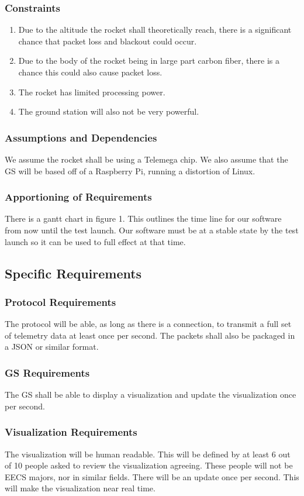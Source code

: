 \documentclass[onecolumn, draftclsnofoot,10pt, compsoc]{IEEEtran}
\begin{document}
\subsubsection{Constraints}
 \begin{enumerate}
    \item Due to the altitude the rocket shall theoretically reach, there is a significant chance that
packet loss and blackout could occur.
    \item Due to the body of the rocket being in large part carbon fiber, there is a chance this could
also cause packet loss.
    \item The rocket has limited processing power.
    \item The ground station will also not be very powerful.
 \end{enumerate}
\subsubsection{Assumptions and Dependencies}
We assume the rocket shall be using a Telemega chip. We also assume that the GS will be
based off of a Raspberry Pi, running a distortion of Linux.
\subsubsection{Apportioning of Requirements}
There is a gantt chart in figure 1. This outlines the time line for our software from now until the
test launch. Our software must be at a stable state by the test launch so it can be used to full
effect at that time.
\subsection{Specific Requirements}
\subsubsection{Protocol Requirements} The protocol will be able, as long as there is a connection, to
transmit a full set of telemetry data at least once per second. The packets shall also be
packaged in a JSON or similar format.

\subsubsection{GS Requirements}
The GS shall be able to display a visualization and update the
visualization once per second.
\subsubsection{Visualization Requirements}
The visualization will be human readable. This will be
defined by at least 6 out of 10 people asked to review the visualization agreeing. These
people will not be EECS majors, nor in similar fields. There will be an update once per
second. This will make the visualization near real time.
\end{document}
